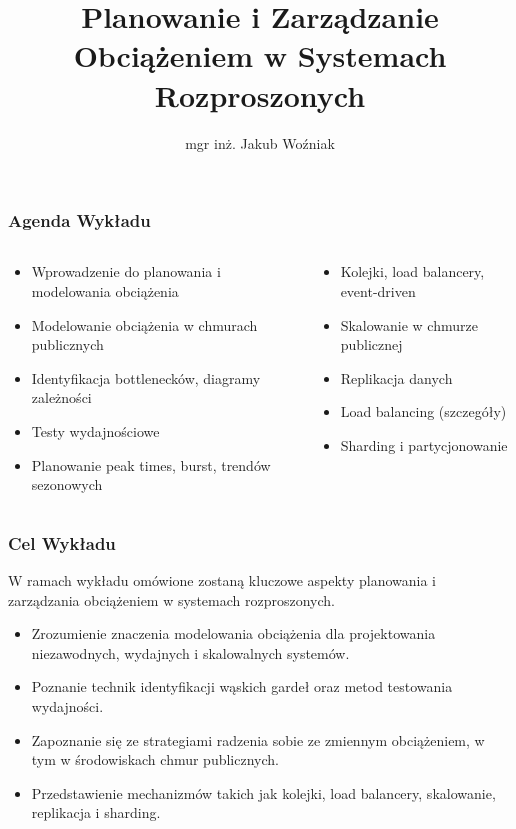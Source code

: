 \documentclass[aspectratio=169,xcolor=table]{beamer}
\title{Planowanie i Zarządzanie Obciążeniem w Systemach Rozproszonych}
\author{mgr inż. Jakub Woźniak}
\institute[PUT]{Zakład Systemów Informatycznych\\Instytut Informatyki Politechniki Poznańskiej}
\date{}
\begin{document}
\begin{frame}
  \titlepage
\end{frame}

\begin{frame}
  \frametitle{Agenda Wykładu}
  \begin{columns}[T] %
  \begin{column}{0.5\textwidth}
  \begin{itemize}
    \item Wprowadzenie do planowania i modelowania obciążenia
    \item Modelowanie obciążenia w chmurach publicznych
    \item Identyfikacja bottlenecków, diagramy zależności
    \item Testy wydajnościowe
    \item Planowanie peak times, burst, trendów sezonowych
  \end{itemize}
  \end{column}
  \begin{column}{0.5\textwidth}
  \begin{itemize}
    \item Kolejki, load balancery, event-driven
    \item Skalowanie w chmurze publicznej
    \item Replikacja danych
    \item Load balancing (szczegóły)
    \item Sharding i partycjonowanie
  \end{itemize}
  \end{column}
  \end{columns}
\end{frame}

\begin{frame}
  \frametitle{Cel Wykładu}
  W ramach wykładu omówione zostaną kluczowe aspekty planowania i zarządzania obciążeniem w systemach rozproszonych.
  \vspace{1em}
  \begin{itemize}
    \item Zrozumienie znaczenia modelowania obciążenia dla projektowania niezawodnych, wydajnych i skalowalnych systemów.
    \item Poznanie technik identyfikacji wąskich gardeł oraz metod testowania wydajności.
    \item Zapoznanie się ze strategiami radzenia sobie ze zmiennym obciążeniem, w tym w środowiskach chmur publicznych.
    \item Przedstawienie mechanizmów takich jak kolejki, load balancery, skalowanie, replikacja i sharding.
  \end{itemize}
\end{frame}
\end{document}
